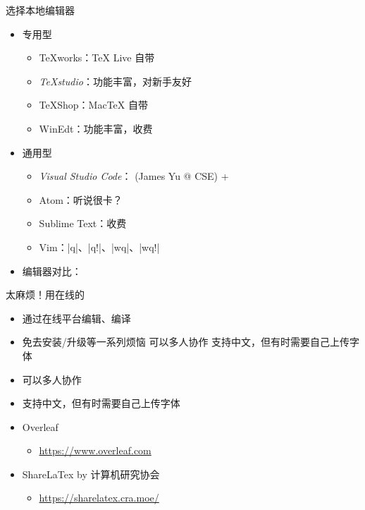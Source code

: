 \begin{frame}[fragile]{选择本地编辑器}
  \begin{itemize}
    \item<+-> 专用型
  
      \begin{itemize}
        \item TeXworks：\TeX{} Live 自带 \faWindows{} \faApple{} \faLinux{}
        \item \emph{TeXstudio}：功能丰富，对新手友好 \faWindows{} \faApple{} \faLinux{}
        \item TeXShop：Mac\TeX{} 自带 \faApple{}
        \item WinEdt：功能丰富，收费 \faWindows{}
      \end{itemize}
  
    \item<+-> 通用型
  
      \begin{itemize}
        \item \emph{Visual Studio Code}： (James Yu @ CSE) + 
        \item Atom：听说很卡？
        \item Sublime Text：收费
        \item Vim：|q|、|q!|、|wq|、|wq!|
      \end{itemize}

    \item<+-> 编辑器对比：
  \end{itemize}
\end{frame}


\begin{frame}[fragile]{太麻烦！用在线的}

    \begin{itemize}
        \item 通过在线平台编辑、编译
        \item 免去安装/升级等一系列烦恼 可以多人协作 支持中文，但有时需要自己上传字体
        \item 可以多人协作
        \item 支持中文，但有时需要自己上传字体
    \end{itemize}

    \begin{itemize}
      \item Overleaf
      \begin{itemize}
          \item \url{https://www.overleaf.com}
      \end{itemize}
      \item ShareLaTex by 计算机研究协会
      \begin{itemize}
        \item \url{https://sharelatex.cra.moe/}
    \end{itemize}
      \end{itemize}
  \end{frame}

